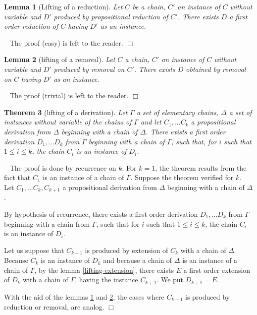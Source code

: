 \documentclass{article}
\newtheorem{theoreme}{Theorem}\newtheorem{lemme}[theoreme]{Lemma}
\newenvironment{preuve}{\noindent {\em Proof :}\ }{{\hfill
    $\Box$}\vspace{.5pc}} \newcommand{\sg}{\!\!<\!\!}
\begin{document}
\begin{lemme}[Lifting of a reduction]\label{lifting-reduction}
Let $C$ be a chain, $C'$ an instance of $C$ without variable and $D'$ produced by propositional reduction of $C'$.
There exists $D$ a first order reduction of $C$ having $D'$ as an instance.
\end{lemme}

\begin{preuve}
The proof (easy) is left to the reader.
\end{preuve}

\begin{lemme}[lifting of a removal]\label{lifting-removal}
Let $C$ a chain, $C'$ an instance of $C$ without variable and $D'$ produced by removal on $C'$.
There exists $D$ obtained by removal on $C$ having $D'$ as an instance.
\end{lemme}

\begin{preuve}
The proof (trivial) is left to the reader.
\end{preuve}

\begin{theoreme}[lifting of a derivation]\label{lifting-derivation}
Let $\Gamma$ a set of elementary chains, $\Delta$ a set of instances without variable of the chains of $\Gamma$ and
let $C_1,...C_k$ a propositional derivation from $\Delta$ beginning with a chain of $\Delta$.
There exists a first order derivation $D_1,...D_k$ from $\Gamma$ beginning with a chain of $\Gamma$, such that,
for $i$ such that $1 \le i \le k$, the chain $C_i$ is an instance of $D_i$.
\end{theoreme}

\begin{preuve}
The proof is done by recurrence on $k$.
For $k =1$, the theorem results from the fact that $C_1$ is an instance of a chain of $\Gamma$. 
Suppose the theorem verified for $k$. Let $C_1,...C_k,C_{k+1}$ a propositional derivation from $\Delta$
beginning with a chain of $\Delta$.

By hypothesis of recurrence, there exists a first order derivation $D_1, ...D_k$ from $\Gamma$ beginning with a chain from 
$\Gamma$, such that for $i$ such that $1 \le i \le k$, the chain $C_i$ is an instance of $D_i$.

Let us suppose that $C_{k+1}$ is produced by extension of $C_k$ with a chain of $\Delta$. Because $C_k$ is an instance of $D_k$ and
because a chain of $\Delta$ is an instance of a chain of $\Gamma$, by the lemma \ref{lifting-extension}, there exists $E$ a 
first order extension of $D_k$ with a chain of $\Gamma$, having the instance $C_{k+1}$. We put $D_{k+1}=E$.

With the aid of the lemmas \ref{lifting-reduction} and \ref{lifting-removal}, the cases where $C_{k+1}$ is produced by reduction
or removal, are analog.
\end{preuve}
\end{document}
